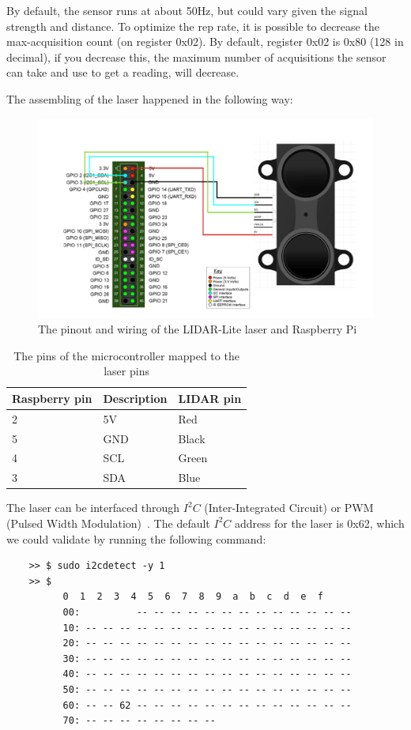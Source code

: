 By default, the sensor runs at about 50Hz, but could vary given the signal strength and distance. To optimize the rep rate, it is possible to decrease the max-acquisition count (on register 0x02). By default, register 0x02 is 0x80 (128 in decimal), if you decrease this, the maximum number of acquisitions the sensor can take and use to get a reading, will decrease\cite{reprate}.

\pagebreak

The assembling of the laser happened in the following way:

\begin{figure}[H]
	\centering
	\includegraphics[scale=.35]{images/laderraspberryconnection.png}
	\caption{The pinout and wiring of the LIDAR-Lite laser and Raspberry Pi}
	\label{fig:wiringlidarpi}
\end{figure}

\begin{table}[H]
	\centering
	\begin{tabular}{|l|l|l|}
		\hline
		\textbf{Raspberry pin} & \textbf{Description} & \textbf{LIDAR pin} \\ \hline
		2 & 5V & Red \\ \hline
		5 & GND & Black \\ \hline
		4 & SCL & Green \\ \hline
		3 & SDA & Blue \\ \hline
	\end{tabular}
	\caption{The pins of the microcontroller mapped to the laser pins}
\end{table}

The laser can be interfaced through $I^2C$ (Inter-Integrated Circuit) or PWM (Pulsed Width Modulation)~\cite{lidarsum}. The default $I^2C$ address for the laser is 0x62, which we could validate by running the following command:
\lstset{language=sh}
\begin{lstlisting}
	>> $ sudo i2cdetect -y 1
	>> $
		  0  1  2  3  4  5  6  7  8  9  a  b  c  d  e  f
		  00:          -- -- -- -- -- -- -- -- -- -- -- -- --
		  10: -- -- -- -- -- -- -- -- -- -- -- -- -- -- -- --
		  20: -- -- -- -- -- -- -- -- -- -- -- -- -- -- -- --
		  30: -- -- -- -- -- -- -- -- -- -- -- -- -- -- -- --
		  40: -- -- -- -- -- -- -- -- -- -- -- -- -- -- -- --
		  50: -- -- -- -- -- -- -- -- -- -- -- -- -- -- -- --
		  60: -- -- 62 -- -- -- -- -- -- -- -- -- -- -- -- --
		  70: -- -- -- -- -- -- -- -- 
\end{lstlisting}

